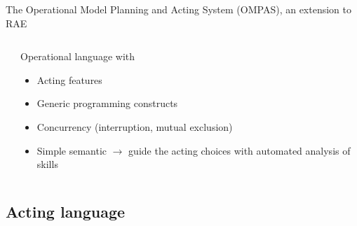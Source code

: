 \begin{frame}{The Operational Model Planning and Acting System (OMPAS), an extension to RAE}
\begin{columns}[t]
\begin{column}{0.5\textwidth}
        \end{column}
        \begin{column}{0.5\textwidth}
        Operational language with
        \begin{itemize}
            \item Acting features
            \item Generic programming constructs
            \item Concurrency (interruption, mutual exclusion)
            \item Simple semantic $\rightarrow$ guide the acting choices with automated analysis of skills
        \end{itemize}
        \end{column}
    \end{columns}
\end{frame}

\subsection{Acting language}

    

